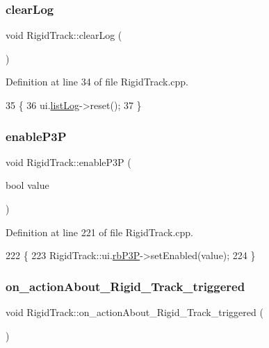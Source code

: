 \subsubsection{\texorpdfstring{clear\+Log}{clearLog}}
{\footnotesize\ttfamily void Rigid\+Track\+::clear\+Log (\begin{DoxyParamCaption}{ }\end{DoxyParamCaption})\hspace{0.3cm}{\ttfamily [slot]}}



Definition at line 34 of file Rigid\+Track.\+cpp.


\begin{DoxyCode}
35 \{
36     ui.\hyperlink{class_ui___rigid_track_class_a8573490fa3f39f7c45af77f33c9b9297}{listLog}->reset();
37 \}
\end{DoxyCode}
\mbox{\label{class_rigid_track_a39aba14e1c846cb3f1773d9145cf96e1}} 
\subsubsection{\texorpdfstring{enable\+P3P}{enableP3P}}
{\footnotesize\ttfamily void Rigid\+Track\+::enable\+P3P (\begin{DoxyParamCaption}\item[{bool}]{value }\end{DoxyParamCaption})\hspace{0.3cm}{\ttfamily [slot]}}



Definition at line 221 of file Rigid\+Track.\+cpp.


\begin{DoxyCode}
222 \{
223     RigidTrack::ui.\hyperlink{class_ui___rigid_track_class_a3f20a41a0b0d35ff5a077530743c82c9}{rbP3P}->setEnabled(value);
224 \}
\end{DoxyCode}
\mbox{\label{class_rigid_track_ac9b641557306f6dff0ac73bc3a9b3f60}} 
\subsubsection{\texorpdfstring{on\+\_\+action\+About\+\_\+\+Rigid\+\_\+\+Track\+\_\+triggered}{on\_actionAbout\_Rigid\_Track\_triggered}}
{\footnotesize\ttfamily void Rigid\+Track\+::on\+\_\+action\+About\+\_\+\+Rigid\+\_\+\+Track\+\_\+triggered (\begin{DoxyParamCaption}{ }\end{DoxyParamCaption})\hspace{0.3cm}{\ttfamily [slot]}}



